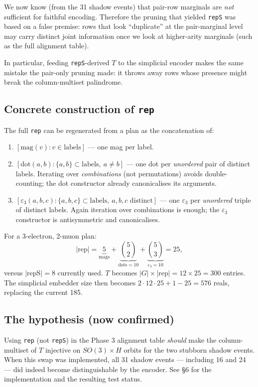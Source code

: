 \documentclass[a4paper,11pt]{article}
\begin{document}
We now know (from the 31 shadow events) that pair-row marginals are
\emph{not} sufficient for faithful encoding.  Therefore the pruning
that yielded \texttt{repS} was based on a false premise: rows that
look ``duplicate'' at the pair-marginal level may carry distinct
joint information once we look at higher-arity marginals (such as the
full alignment table).

In particular, feeding \texttt{repS}-derived $T$ to the simplicial
encoder makes the same mistake the pair-only pruning made: it throws
away rows whose presence might break the column-multiset palindrome.

\subsection{Concrete construction of \texttt{rep}}
The full \texttt{rep} can be regenerated from a plan as the
concatenation of:

\begin{enumerate}[nosep]
  \item $[\text{mag}(v) : v \in \text{labels}]$ --- one mag per label.
  \item $[\text{dot}(a,b) : \{a,b\} \subset \text{labels},\ a \neq b]$
        --- one dot per \emph{unordered} pair of distinct labels.
        Iterating over \emph{combinations} (not permutations) avoids
        double-counting; the dot constructor already
        canonicalises its arguments.
  \item $[\varepsilon_3(a,b,c) : \{a,b,c\} \subset \text{labels},\
        a,b,c \text{ distinct}]$ --- one $\varepsilon_3$ per
        \emph{unordered} triple of distinct labels.  Again iteration
        over combinations is enough; the $\varepsilon_3$ constructor
        is antisymmetric and canonicalises.
\end{enumerate}

For a 3-electron, 2-muon plan:
\[
  |\text{rep}| = \underbrace{5}_{\text{mags}}
               + \underbrace{\binom{5}{2}}_{\text{dots} = 10}
               + \underbrace{\binom{5}{3}}_{\varepsilon_3 = 10}
               = 25,
\]
versus $|\text{repS}| = 8$ currently used.  $T$ becomes
$|G| \times |\text{rep}| = 12 \times 25 = 300$ entries.  The
simplicial embedder size then becomes $2 \cdot 12 \cdot 25 + 1 - 25 =
576$ reals, replacing the current 185.

\subsection{The hypothesis (now confirmed)}
Using \texttt{rep} (not \texttt{repS}) in the Phase 3 alignment table
\emph{should} make the column-multiset of $T$ injective on
$SO(3) \times H$ orbits for the two stubborn shadow events.  When
this swap was implemented, all 31 shadow events --- including 16 and
24 --- did indeed become distinguishable by the encoder.  See \S6 for
the implementation and the resulting test status.
\end{document}
